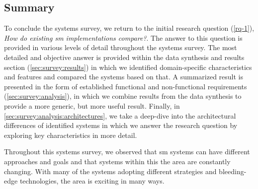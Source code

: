 \subsection{Summary}
\label{sec:survey:summary}

To conclude the systems survey, we return to the initial research question (\ref{rq-1}), \textit{How do existing \gls{sm} implementations compare?}. The answer to this question is provided in various levels of detail throughout the systems survey. The most detailed and objective answer is provided  within the data synthesis and results section (\cref{sec:survey:results}) in which we identified domain-specific characteristics and features and compared the systems based on that. A summarized result is presented in the form of established functional and non-functional requirements (\cref{sec:survey:analysis}), in which we combine results from the data synthesis to provide a more generic, but more useful result. Finally, in \cref{sec:survey:analysis:architectures}, we take a deep-dive into the architectural differences of identified systems in which we answer the research question by exploring key characteristics in more detail.

Throughout this systems survey, we observed that \gls{sm} systems can have different approaches and goals and that systems within this the area are constantly changing. With many of the systems adopting different strategies and bleeding-edge technologies, the area is exciting in many ways. 